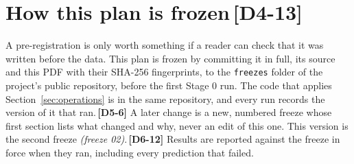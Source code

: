 \documentclass[11pt]{article}
\newcommand{\gl}[1]{{\color{soft}\itshape\small (#1)}}
\newcommand{\chg}[1]{\,{\color{chgcol}\bfseries\footnotesize[#1]}}
\newcommand{\chgold}[1]{\,{\color{oldcol}\bfseries\footnotesize[#1]}}
\begin{document}
\section[How this plan is frozen]{How this plan is frozen\protect\chgold{D4-13}}\label{sec:freeze}
A pre-registration is only worth something if a reader can check that it was written before the data. This plan is frozen by committing it in full, its source and this PDF with their SHA-256 fingerprints, to the \texttt{freezes} folder of the project's public repository, before the first Stage 0 run. The code that applies Section~\ref{sec:operations} is in the same repository, and every run records the version of it that ran.\chgold{D5-6} A later change is a new, numbered freeze whose first section lists what changed and why, never an edit of this one. This version is the second freeze \gl{freeze 02}.\chg{D6-12} Results are reported against the freeze in force when they ran, including every prediction that failed.
\end{document}

